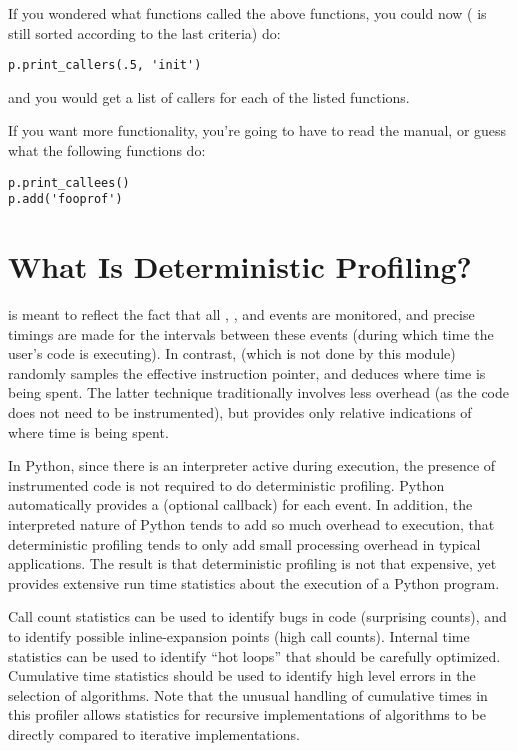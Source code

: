 If you wondered what functions called the above functions, you could
now ( is still sorted according to the last criteria) do:

\begin{verbatim}
p.print_callers(.5, 'init')
\end{verbatim}

and you would get a list of callers for each of the listed functions. 

If you want more functionality, you're going to have to read the
manual, or guess what the following functions do:

\begin{verbatim}
p.print_callees()
p.add('fooprof')
\end{verbatim}

\section{What Is Deterministic Profiling?}

 is meant to reflect the fact that all
, , and  events
are monitored, and precise timings are made for the intervals between
these events (during which time the user's code is executing).  In
contrast,  (which is not done by this
module) randomly samples the effective instruction pointer, and
deduces where time is being spent.  The latter technique traditionally
involves less overhead (as the code does not need to be instrumented),
but provides only relative indications of where time is being spent.

In Python, since there is an interpreter active during execution, the
presence of instrumented code is not required to do deterministic
profiling.  Python automatically provides a  (optional
callback) for each event.  In addition, the interpreted nature of
Python tends to add so much overhead to execution, that deterministic
profiling tends to only add small processing overhead in typical
applications.  The result is that deterministic profiling is not that
expensive, yet provides extensive run time statistics about the
execution of a Python program.

Call count statistics can be used to identify bugs in code (surprising
counts), and to identify possible inline-expansion points (high call
counts).  Internal time statistics can be used to identify ``hot
loops'' that should be carefully optimized.  Cumulative time
statistics should be used to identify high level errors in the
selection of algorithms.  Note that the unusual handling of cumulative
times in this profiler allows statistics for recursive implementations
of algorithms to be directly compared to iterative implementations.


